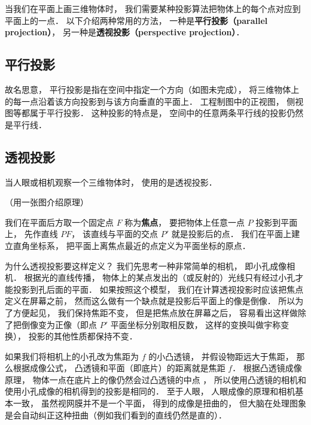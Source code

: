 

当我们在平面上画三维物体时， 我们需要某种投影算法把物体上的每个点对应到平面上的一点． 以下介绍两种常用的方法， 一种是\textbf{平行投影（parallel projection）}， 另一种是\textbf{透视投影（perspective projection）}．


\subsection{平行投影}
故名思意， 平行投影是指在空间中指定一个方向（如图未完成）， 将三维物体上的每一点沿着该方向投影到与该方向垂直的平面上． 工程制图中的正视图， 侧视图等都属于平行投影． 这种投影的特点是， 空间中的任意两条平行线的投影仍然是平行线．

\subsection{透视投影}
当人眼或相机观察一个三维物体时， 使用的是透视投影．

（用一张图介绍原理）

我们在平面后方取一个固定点 $F$ 称为\textbf{焦点}， 要把物体上任意一点 $P$ 投影到平面上， 先作直线 $PF$， 该直线与平面的交点 $P'$ 就是投影后的点． 我们在平面上建立直角坐标系， 把平面上离焦点最近的点定义为平面坐标的原点．

为什么透视投影要这样定义？ 我们先思考一种非常简单的相机， 即小孔成像相机． 根据光的直线传播， 物体上的某点发出的（或反射的）光线只有经过小孔才能投影到孔后面的平面． 如果按照这个模型， 我们在计算透视投影时应该把焦点定义在屏幕之前， 然而这么做有一个缺点就是投影后平面上的像是倒像． 所以为了方便起见， 我们保持焦距不变， 但是把焦点放在屏幕之后， 容易看出这样做除了把倒像变为正像（即点 $P'$ 平面坐标分别取相反数， 这样的变换叫做宇称变换）， 投影的其他性质都保持不变． %

如果我们将相机上的小孔改为焦距为 $f$ 的小凸透镜， 并假设物距远大于焦距， 那么根据成像公式， 凸透镜和平面（即底片）的距离就是焦距 $f$． 根据凸透镜成像原理， 物体一点在底片上的像仍然会过凸透镜的中点%
， 所以使用凸透镜的相机和使用小孔成像的相机得到的投影是相同的． 至于人眼， 人眼成像的原理和相机基本一致， 虽然视网膜并不是一个平面， 得到的成像是扭曲的， 但大脑在处理图象是会自动纠正这种扭曲（例如我们看到的直线仍然是直的）．

